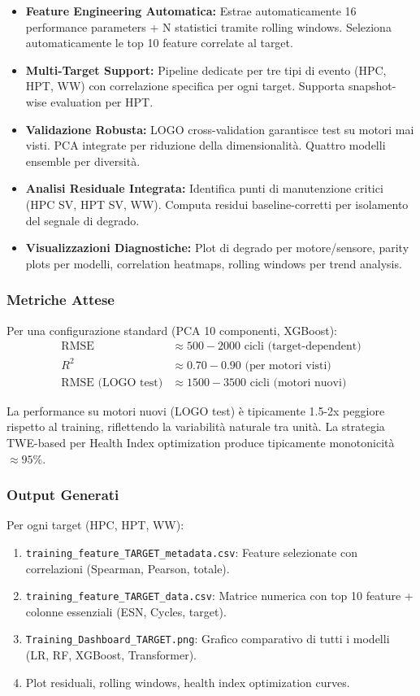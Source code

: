 \begin{itemize}
    \item \textbf{Feature Engineering Automatica:} Estrae automaticamente 16 performance parameters + N statistici tramite rolling windows. Seleziona automaticamente le top 10 feature correlate al target.
    \item \textbf{Multi-Target Support:} Pipeline dedicate per tre tipi di evento (HPC, HPT, WW) con correlazione specifica per ogni target. Supporta snapshot-wise evaluation per HPT.
    \item \textbf{Validazione Robusta:} LOGO cross-validation garantisce test su motori mai visti. PCA integrate per riduzione della dimensionalità. Quattro modelli ensemble per diversità.
    \item \textbf{Analisi Residuale Integrata:} Identifica punti di manutenzione critici (HPC SV, HPT SV, WW). Computa residui baseline-corretti per isolamento del segnale di degrado.
    \item \textbf{Visualizzazioni Diagnostiche:} Plot di degrado per motore/sensore, parity plots per modelli, correlation heatmaps, rolling windows per trend analysis.
\end{itemize}

\subsubsection{Metriche Attese}

Per una configurazione standard (PCA 10 componenti, XGBoost):
\begin{align}
\text{RMSE} &\approx 500-2000 \text{ cicli (target-dependent)} \\
R^2 &\approx 0.70-0.90 \text{ (per motori visti)} \\
\text{RMSE (LOGO test)} &\approx 1500-3500 \text{ cicli (motori nuovi)}
\end{align}

La performance su motori nuovi (LOGO test) è tipicamente 1.5-2x peggiore rispetto al training, riflettendo la variabilità naturale tra unità. La strategia TWE-based per Health Index optimization produce tipicamente monotonicità $\approx 95\%$.

\subsubsection{Output Generati}

Per ogni target (HPC, HPT, WW):
\begin{enumerate}
    \item \texttt{training\_feature\_TARGET\_metadata.csv}: Feature selezionate con correlazioni (Spearman, Pearson, totale).
    \item \texttt{training\_feature\_TARGET\_data.csv}: Matrice numerica con top 10 feature + colonne essenziali (ESN, Cycles, target).
    \item \texttt{Training\_Dashboard\_TARGET.png}: Grafico comparativo di tutti i modelli (LR, RF, XGBoost, Transformer).
    \item Plot residuali, rolling windows, health index optimization curves.
\end{enumerate}

